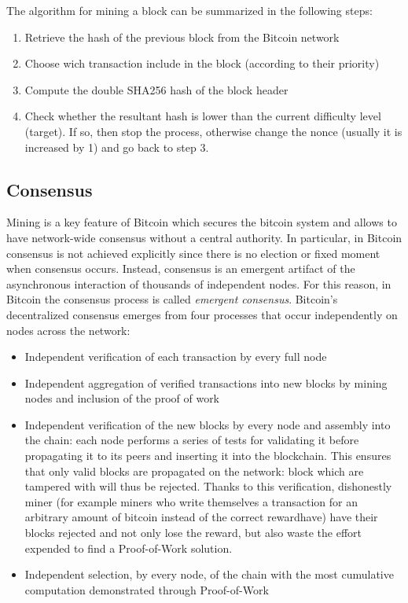 The algorithm for mining a block can be summarized in the following steps:
\begin{enumerate}
  \item Retrieve the hash of the previous block from the Bitcoin network
  \item Choose wich transaction include in the block (according to their priority)
  \item Compute the double SHA256 hash of the block header
  \item Check whether the resultant hash is lower than the current difficulty level
  (target). If so, then stop the process, otherwise change the nonce (usually it is
  increased by 1) and go back to step 3.
\end{enumerate}















\subsection{Consensus} Mining is a key feature of Bitcoin which secures the
bitcoin system and allows to have network-wide consensus without a central
authority. In particular, in Bitcoin consensus is not achieved explicitly since
there is no election or fixed moment when consensus occurs. Instead, consensus
is an emergent artifact of the asynchronous interaction of thousands of
independent nodes. For this reason, in Bitcoin the consensus process is called
\emph{emergent consensus}. Bitcoin’s decentralized consensus emerges from
four processes that occur independently on nodes across the network:
\begin{itemize}
  \item Independent verification of each transaction by every full node
  \item Independent aggregation of verified transactions into new blocks by mining
  nodes and inclusion of the proof of work
  \item Independent verification of the new blocks by every node and assembly
  into the chain: each node performs a series of tests for validating it before
  propagating it to its peers and inserting it into the blockchain.
  This ensures that only valid blocks are propagated on the network: block which
  are tampered with will thus be rejected.
  Thanks to this verification, dishonestly miner (for example miners who write
  themselves a transaction for an arbitrary amount of bitcoin instead of the correct rewardhave)
  have their blocks rejected and not only lose the reward, but also waste the
  effort expended to find a Proof-of-Work solution.
  \item Independent selection, by every node, of the chain with the most
  cumulative computation demonstrated through Proof-of-Work
\end{itemize}


